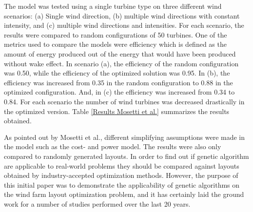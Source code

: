 \noindent The model was tested using a single turbine type on three different wind scenarios: (a) Single wind direction, (b) multiple wind directions with constant intensity, and (c) multiple wind directions and intensities. For each scenario, the results were compared to random configurations of 50 turbines. One of the metrics used to compare the models were efficiency which is defined as the amount of energy produced out of the energy that would have been produced without wake effect. In scenario (a), the efficiency of the random configuration was 0.50, while the efficiency of the optimized solution was 0.95. In (b), the efficiency was increased from 0.35 in the random configuration to 0.88 in the optimized configuration. And, in (c) the efficiency was increased from 0.34 to 0.84. For each scenario the number of wind turbines was decreased drastically in the optimized version. Table \ref{Results Mosetti et al.} summarizes the results obtained.

\begin{center}
\begin{table}[h!]
\caption{Optimized configurations compared against random configurations for each of the three scenarios (a) single wind direction, (b) multiple wind directions with constant intensity and (c) multiple wind directions and intensities{\citep{Mosetti}}.}
\label{Results Mosetti et al.}
\end{table}
\end{center}


\noindent As pointed out by Mosetti et al., different simplifying assumptions were made in the model such as the cost- and power model. The results were also only compared to randomly generated layouts. In order to find out if genetic algorithm are applicable to real-world problems they should be compared against layouts obtained by industry-accepted optimization methods. However, the purpose of this initial paper was to demonstrate the applicability of genetic algorithms on the wind farm layout optimization problem, and it has certainly laid the ground work for a number of studies performed over the last 20 years. \\


